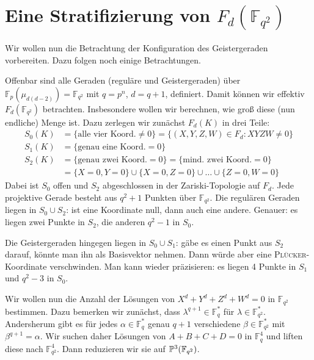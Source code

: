 \section{Eine Stratifizierung von $F_d(\mathbb F_{q^2})$}
Wir wollen nun die Betrachtung der Konfiguration des Geistergeraden vorbereiten. Dazu folgen noch einige Betrachtungen.

Offenbar sind alle Geraden (reguläre und Geistergeraden) über $\mathbb F_p(\mu_{d(d-2)}) = \mathbb F_{q^2}$ mit $q = p^n$, $d = q+1$, definiert. Damit können wir effektiv $F_d(\mathbb F_{q^2})$ betrachten. Insbesondere wollen wir berechnen, wie groß diese (nun endliche) Menge ist. Dazu zerlegen wir zunächst $F_d(K)$ in drei Teile:
\begin{align*}
S_0(K) &= \{\text{alle vier Koord.}\neq 0\} = \{(X,Y,Z,W) \in F_d : XYZW \neq 0\} \\
S_1(K) &= \{\text{genau eine Koord.}= 0\} \\
S_2(K) &= \{\text{genau zwei Koord.}= 0\} = \{\text{mind. zwei Koord.}= 0\} \\
	&= \{X = 0, Y = 0\} \cup \{X = 0, Z = 0\} \cup \dots \cup \{Z = 0, W = 0\}
\end{align*}
Dabei ist $S_0$ offen und $S_2$ abgeschlossen in der Zariski-Topologie auf $F_d$. Jede projektive Gerade besteht aus $q^2+1$ Punkten über $\mathbb F_{q^2}$. Die regulären Geraden liegen in $S_0 \cup S_2$: ist eine Koordinate null, dann auch eine andere. Genauer: es liegen zwei Punkte in $S_2$, die anderen $q^2-1$ in $S_0$.

Die Geistergeraden hingegen liegen in $S_0 \cup S_1$: gäbe es einen Punkt aus $S_2$ darauf, könnte man ihn als Basisvektor nehmen. Dann würde aber eine \textsc{Plücker}-Koordinate verschwinden. Man kann wieder präzisieren: es liegen 4 Punkte in $S_1$ und $q^2-3$ in $S_0$.

Wir wollen nun die Anzahl der Lösungen von $X^d+Y^d+Z^d+W^d=0$ in $\mathbb F_{q^2}$ bestimmen. Dazu bemerken wir zunächst, dass $\lambda^{q+1} \in \mathbb F_q^*$ für $\lambda \in \mathbb F_{q^2}^*$. Andersherum gibt es für jedes $\alpha \in \mathbb F_q^*$ genau $q+1$ verschiedene $\beta \in \mathbb F_{q^2}^*$ mit $\beta^{q+1} = \alpha$. Wir suchen daher Lösungen von $A+B+C+D=0$ in $\mathbb F_q^4$ und liften diese nach $\mathbb F_{q^2}^4$. Dann reduzieren wir sie auf $\mathbb P^{3}(\mathbb F_{q^2})$.


